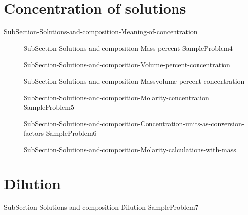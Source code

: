 \documentclass[main.tex]{subfiles} %
\begin{document}
\section{Concentration of solutions} {SubSection-Solutions-and-composition-Meaning-of-concentration}
 \sloppy\begin{description}
\item[]{SubSection-Solutions-and-composition-Mass-percent}
{SampleProblem4}
\item[] {SubSection-Solutions-and-composition-Volume-percent-concentration}
\item[]{SubSection-Solutions-and-composition-Massvolume-percent-concentration}
\item[]{SubSection-Solutions-and-composition-Molarity-concentration}
{SampleProblem5}


\item[]{SubSection-Solutions-and-composition-Concentration-units-as-conversion-factors}
{SampleProblem6}
\item[]{SubSection-Solutions-and-composition-Molarity-calculations-with-mass}
\end{description}


\section{Dilution}{SubSection-Solutions-and-composition-Dilution}
{SampleProblem7}
 
\end{document}
